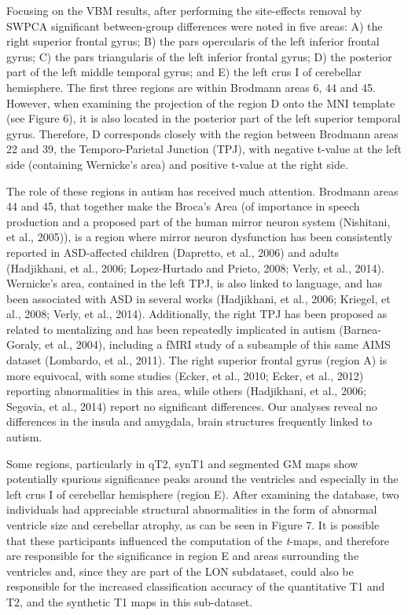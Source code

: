 Focusing on the \ac{VBM} results, after performing the site-effects removal
by \ac{SWPCA} significant between-group differences were noted in five
areas: A) the right superior frontal gyrus; B) the pars opercularis of
the left inferior frontal gyrus; C) the pars triangularis of the left
inferior frontal gyrus; D) the posterior part of the left middle
temporal gyrus; and E) the left crus I of cerebellar hemisphere. The
first three regions are within Brodmann areas 6, 44 and 45. However,
when examining the projection of the region D onto the MNI template
(see Figure 6), it is also located in the posterior part of the left
superior temporal gyrus. Therefore, D corresponds closely with the
region between Brodmann areas 22 and 39, the Temporo-Parietal Junction
(TPJ), with negative t-value at the left side (containing
Wernicke's area) and positive t-value at the right
side. 


The role of these regions in autism has received much attention.
Brodmann areas 44 and 45, that together make the Broca’s Area (of
importance in speech production and a proposed part of the human mirror
neuron system (Nishitani, et al., 2005)), is a region where mirror
neuron dysfunction has been consistently reported in \ac{ASD}-affected
children (Dapretto, et al., 2006) and adults (Hadjikhani, et al., 2006;
Lopez-Hurtado and Prieto, 2008; Verly, et al., 2014). Wernicke’s area,
contained in the left TPJ, is also linked to language, and has been
associated with \ac{ASD} in several works (Hadjikhani, et al., 2006;
Kriegel, et al., 2008; Verly, et al., 2014). Additionally, the right
TPJ has been proposed as related to mentalizing and has been repeatedly
implicated in autism (Barnea-Goraly, et al., 2004), including a f\ac{MRI}
study of a subsample of this same AIMS dataset (Lombardo, et al.,
2011). The right superior frontal gyrus (region A) is more equivocal,
with some studies (Ecker, et al., 2010; Ecker, et al., 2012) reporting
abnormalities in this area, while others (Hadjikhani, et al., 2006;
Segovia, et al., 2014) report no significant differences. Our analyses
reveal no differences in the insula and amygdala, brain structures
frequently linked to autism. 


Some regions, particularly in \ac{qT2}, \ac{synT1} and segmented \ac{GM} maps show
potentially spurious significance peaks around the ventricles and
especially in the left crus I of cerebellar hemisphere (region E).
After examining the database, two individuals had appreciable
structural abnormalities in the form of abnormal ventricle size and
cerebellar atrophy, as can be seen in Figure 7. It is possible that
these participants influenced the computation of the \textit{t}{}-maps,
and therefore are responsible for the significance in region E and
areas surrounding the ventricles and, since they are part of the LON
subdataset, could also be responsible for the increased classification
accuracy of the quantitative T1 and T2, and the synthetic T1 maps in
this sub-dataset.


